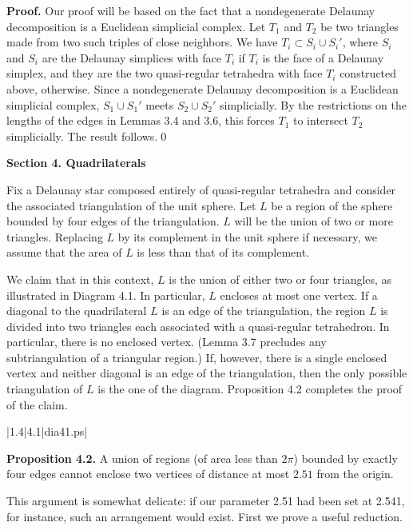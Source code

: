 {\bf Proof.}  
Our proof will be based on the fact that a nondegenerate
Delaunay decomposition is a Euclidean simplicial complex.
 Let $T_1$ and $T_2$
be two triangles made from two such triples of close neighbors.
We have $T_i\subset S_i\cup S_i'$, where $S_i$ and $S_i$ are
the Delaunay simplices with face $T_i$ if $T_i$ is the face
of a Delaunay simplex, and they are the two quasi-regular
tetrahedra with face $T_i$ constructed above, otherwise.
Since a nondegenerate Delaunay decomposition is a 
Euclidean simplicial complex, $S_1\cup S_1'$
meets $S_2\cup S_2'$ simplicially.  By the restrictions on the
lengths of the edges in Lemmas 3.4 and 3.6, this forces 
$T_1$ to
 intersect $T_2$ simplicially.
The result follows.\qed 


\bigskip\hbox{}\bigskip
\centerline{\bf Section 4. Quadrilaterals}

Fix a Delaunay star composed entirely of quasi-regular tetrahedra and
consider the associated triangulation of the unit sphere.  Let $L$ be
a region of the sphere bounded by four edges of the triangulation.
$L$ will be the union of two or more triangles.  Replacing $L$ by
its complement in the unit sphere if necessary, we assume that the area
of $L$ is less than that of its complement.

\bigskip
We claim that in this context, $L$ is the union of either
two or four triangles, as illustrated in Diagram 4.1.  In particular,
$L$ encloses at most one vertex.
If a diagonal to the quadrilateral $L$ is an edge of the
triangulation, the region $L$ is divided into two triangles each
associated with a quasi-regular tetrahedron.  In particular, there
is no enclosed vertex.  (Lemma 3.7
precludes any subtriangulation of a triangular region.)  If, however,
there is a single enclosed vertex and neither
diagonal is an edge of the triangulation,  then the only possible
triangulation of $L$ is the one of the diagram.  Proposition 4.2
completes the proof of the claim.

\bigskip
\gram|1.4|4.1|dia41.ps|
\bigskip

{\bf Proposition 4.2.}  A union of regions
(of area less than $2\pi$)
 bounded by exactly four
edges 
cannot enclose two vertices of distance at most $2.51$ from the origin.

\bigskip
  This argument
is somewhat delicate:  if our parameter 2.51 had been set at 2.541,
for instance, such an arrangement would exist.  First we prove a useful
reduction.


